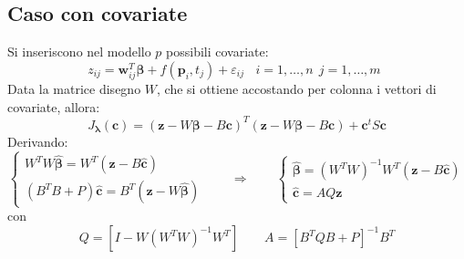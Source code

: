\documentclass[landscape,9pt]{beamer}                           %
\begin{document}
\subsection{Caso con covariate}
\begin{frame}
Si inseriscono nel modello $p$ possibili covariate:
$$
z_{ij}=\bm w_{ij}^T  \bm \beta + f(\bm{p}_i,t_j)+\varepsilon_{ij}\ \ \ \ i = 1,\ldots,n\ \ j=1,\ldots,m \ \ 
$$
Data la matrice disegno $W$, che si ottiene accostando per colonna i vettori di covariate, allora:
$$ J_{\bm \lambda }(\bm c) = (\bm z - W \bm \beta - B \bm c)^T (\bm z - W \bm \beta - B \bm c) + \bm c^t S \bm c $$
Derivando:
$$
\begin{cases}
W^TW \hat{\bm \beta} = W^T(\bm z - B \hat{\bm c})  \\
(B^T B + P) \hat{\bm c}=B^T(\bm z -W \hat{\bm \beta})
\end{cases} \qquad \Rightarrow \qquad
\begin{cases}
\hat{\bm \beta} = (W^TW)^{-1}W^T(\bm z - B \hat{\bm c}) \\
\hat  {\bm c} = AQ \bm z
\end{cases}
$$
con
$$
Q=[I-W(W^TW)^{-1}W^T] \qquad A=[B^TQB+P]^{-1}B^T
$$
\end{frame}
\end{document}
